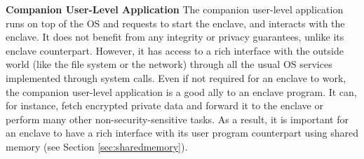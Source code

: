 \textbf{Companion User-Level Application}
The companion user-level application runs on top of the OS and requests to start the enclave, and interacts with the enclave.
It does not benefit from any integrity or privacy guarantees, unlike its enclave counterpart.
However, it has access to a rich interface with the outside world (like the file system or the network) through all the usual OS services implemented through system calls.
Even if not required for an enclave to work, the companion user-level application is a good ally to an enclave program.
It can, for instance, fetch encrypted private data and forward it to the enclave or perform many other non-security-sensitive tasks.
As a result, it is important for an enclave to have a rich interface with its user program counterpart using shared memory (see Section \ref{sec:sharedmemory}).